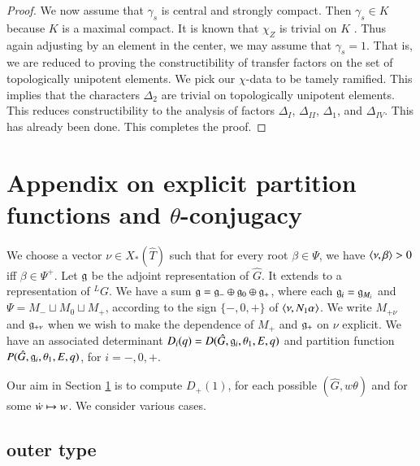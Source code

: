 \begin{proof}
We now assume that $\gamma_s$ is central and strongly compact.  Then
$\gamma_s\in K$ because $K$ is a maximal compact.  It is known that
$\chi_Z$ is trivial on $K$ \cite[Lemma
3.2]{hales1995fundamental}. Thus again adjusting by an element in the
center, we may assume that $\gamma_s=1$.  That is, we are reduced to
proving the constructibility of transfer factors on the set of
topologically unipotent elements.  We pick our $\chi$-data to be
tamely ramified.  This implies that the characters $\Delta_2$ are
trivial on topologically unipotent elements.  This reduces
constructibility to the analysis of factors $\Delta_I$, $\Delta_{II}$,
$\Delta_1$, and $\Delta_{IV}$.  This has already been done.  This
completes the proof.
\end{proof}

\section{Appendix on explicit partition functions and $\theta$-conjugacy}
\label{sec:calc-part}
\label{sec:phi}


We choose a vector $\nu\in X_*(\hat T)$ such that for every root
$\beta\in \Psi$, we have $\langle{\nu,\beta}\rangle>0$ iff $\beta\in\Psi^+$.
Let ${\mathfrak g}$ be the adjoint representation of $\hat G$.  It extends to a
representation of ${}^LG$.  We have a sum ${\mathfrak g} = {\mathfrak g}_-\oplus {\mathfrak g}_0 \oplus
{\mathfrak g}_+$, where each ${\mathfrak g}_i = {\mathfrak g}_{M_i}$ and $\Psi = M_- \sqcup M_0 \sqcup
M_+$, according to the sign $\{-,0,+\}$ of $\langle{\nu,N_1\alpha}\rangle$.  We
write $M_{+\nu}$ and ${\mathfrak g}_{+\nu}$ when we wish to make the dependence
of $M_+$ and ${\mathfrak g}_+$ on $\nu$ explicit.  We have an associated
determinant $D_i(q)=D(\hat G,{\mathfrak g}_i,\theta_1,E,q)$ and partition
function $P(\hat G,{\mathfrak g}_i,\theta_1,E,q)$, for $i=-,0,+$.

Our aim in Section \ref{sec:calc-part} is to compute $D_+(1)$, for
each possible $(\hat G,w\theta)$ and for some $\dot w\mapsto w$.  We
consider various cases.

\subsection{outer type}

